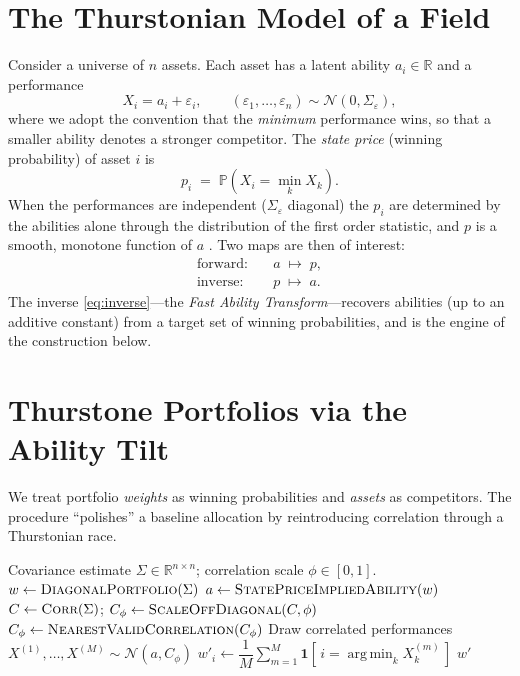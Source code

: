 \documentclass[11pt]{article}
\newcommand{\Prob}{\mathbb{P}}
\newcommand{\R}{\mathbb{R}}
\DeclareMathOperator*{\argminop}{arg\,min}
\begin{document}
\section{The Thurstonian Model of a Field}
\label{sec:model}

Consider a universe of $n$ assets. Each asset has a latent ability $a_i\in\R$ and
a performance
\begin{equation}
  X_i = a_i + \varepsilon_i, \qquad (\varepsilon_1,\dots,\varepsilon_n) \sim
  \mathcal{N}(0, \Sigma_\varepsilon),
  \label{eq:performance}
\end{equation}
where we adopt the convention that the \emph{minimum} performance wins, so that a
smaller ability denotes a stronger competitor. The \emph{state price} (winning
probability) of asset $i$ is
\begin{equation}
  p_i \;=\; \Prob\!\left( X_i = \min_{k} X_k \right).
  \label{eq:stateprice}
\end{equation}
When the performances are independent ($\Sigma_\varepsilon$ diagonal) the
$p_i$ are determined by the abilities alone through the distribution of the first
order statistic, and $p$ is a smooth, monotone function of $a$
\parencite{cotton2021}. Two maps are then of interest:
\begin{align}
  \text{forward:}\quad & a \;\longmapsto\; p, \label{eq:forward}\\
  \text{inverse:}\quad & p \;\longmapsto\; a. \label{eq:inverse}
\end{align}
The inverse \eqref{eq:inverse}---the \emph{Fast Ability Transform}---recovers
abilities (up to an additive constant) from a target set of winning
probabilities, and is the engine of the construction below.

\section{Thurstone Portfolios via the Ability Tilt}
\label{sec:method}

We treat portfolio \emph{weights} as winning probabilities and \emph{assets} as
competitors. The procedure ``polishes'' a baseline allocation by reintroducing
correlation through a Thurstonian race.

\begin{algorithm}[h]
\caption{Ability tilt (Thurstone portfolio)}
\label{alg:tilt}
\begin{algorithmic}[1]
\Require Covariance estimate $\Sigma\in\R^{n\times n}$; correlation scale
         $\phi\in[0,1]$.
\State $w \gets \textsc{DiagonalPortfolio}(\Sigma)$
\State $a \gets \textsc{StatePriceImpliedAbility}(w)$
\State $C \gets \textsc{Corr}(\Sigma)$; \quad
       $C_\phi \gets \textsc{ScaleOffDiagonal}(C, \phi)$
\State $C_\phi \gets \textsc{NearestValidCorrelation}(C_\phi)$
\State Draw correlated performances $X^{(1)},\dots,X^{(M)} \sim
       \mathcal{N}(a, C_\phi)$
\State $w'_i \gets \dfrac{1}{M}\sum_{m=1}^{M}
       \mathbf{1}\!\left[\, i = \argminop_k X^{(m)}_k \,\right]$
\State \Return $w'$
\end{algorithmic}
\end{algorithm}
\end{document}
